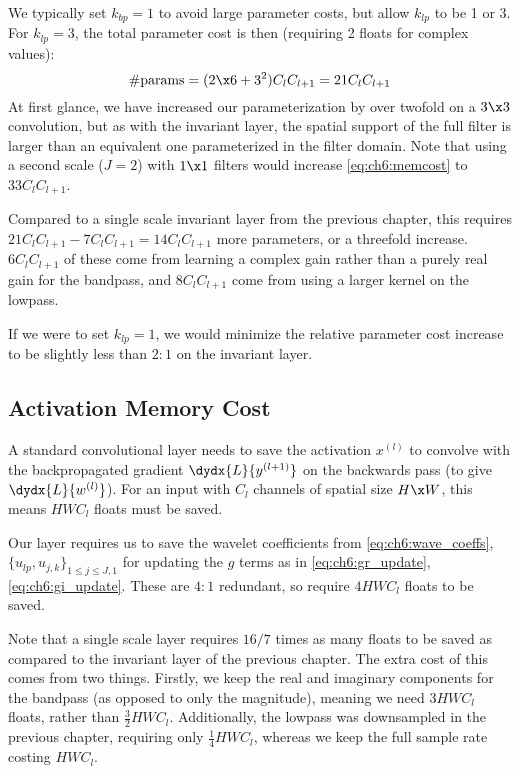 We typically set $k_{bp} = 1$ to avoid large parameter costs, but allow $k_{lp}$
to be 1 or 3. For $k_{lp} = 3$, the total parameter cost is then (requiring 2
floats for complex values):
%
\begin{equation}
  \text{\#params} = (2\x 6 + 3^2)C_lC_{l+1} = 21C_lC_{l+1} \label{eq:ch6:memcost}
\end{equation} 
%
At first glance, we have increased our parameterization by over twofold on a $3\x 3$ 
convolution, but as with the invariant layer, the spatial support of the full
filter is larger than an equivalent one parameterized in the filter domain. Note
that using a second scale ($J=2$) with $1\x 1$ filters would increase
\eqref{eq:ch6:memcost} to $33C_lC_{l+1}$. 

Compared to a single scale invariant layer from the previous chapter, this requires
$21C_lC_{l+1} - 7C_lC_{l+1} = 14C_lC_{l+1}$ more parameters, or a threefold
increase. $6C_lC_{l+1}$ of these come from learning a complex gain rather than a
purely real gain for the bandpass, and $8C_lC_{l+1}$ come from using a larger
kernel on the lowpass. 

If we were to set $k_{lp} = 1$, we would minimize the 
relative parameter cost increase to be slightly
less than $2:1$ on the invariant layer.

\subsection{Activation Memory Cost}\label{sec:ch6:act_memory}
A standard convolutional layer needs to save the activation $x^{(l)}$ to
convolve with the backpropagated gradient $\dydx{L}{y^{(l+1)}}$ on the backwards
pass (to give $\dydx{L}{w^{(l)}}$). For an input with $C_l$ channels of spatial
size $H\x W$, this means $HWC_l$ floats must be saved. 

Our layer requires us to save the wavelet coefficients from \eqref{eq:ch6:wave_coeffs}, 
$\{u_{lp}, u_{j,k}\}_{1\leq j \leq J, 1}$ for updating the $g$ terms 
as in \eqref{eq:ch6:gr_update}, \eqref{eq:ch6:gi_update}.
These are $4:1$ redundant, so require $4HWC_l$ floats to be saved.

Note that a single scale layer requires $16/7$ times as many floats to be saved
as compared to the invariant layer of the previous chapter. The extra cost of
this comes from two things. Firstly, we keep the real and imaginary components
for the bandpass (as opposed to only the magnitude), meaning we need $3HWC_l$
floats, rather than $\frac{3}{2}HWC_l$. Additionally, the lowpass was
downsampled in the previous chapter, requiring only $\frac{1}{4}HWC_l$, whereas
we keep the full sample rate costing $HWC_l$.

